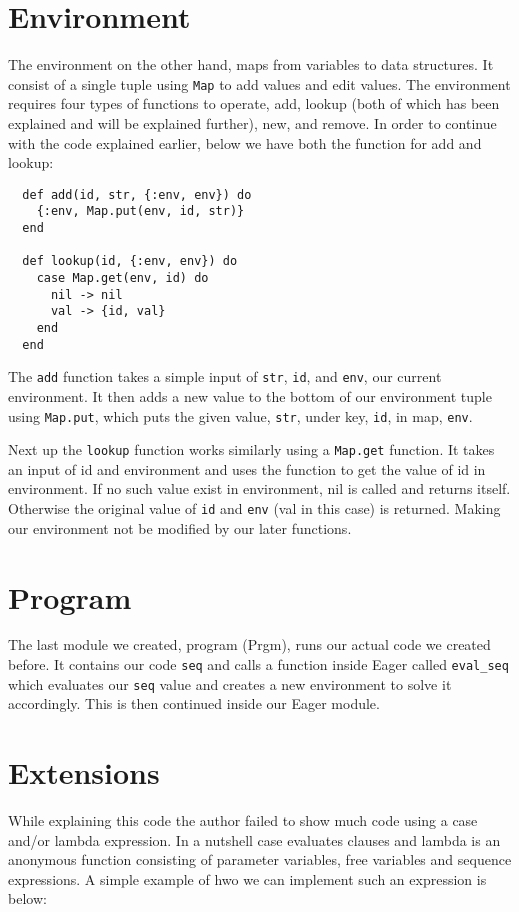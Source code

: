 \documentclass[a4paper,11pt]{article}
\begin{document}
\section*{Environment}

The environment on the other hand, maps from variables to data structures. It consist of a single tuple using {\tt Map} to add values and edit values. The environment requires four types of functions to operate, add, lookup (both of which has been explained and will be explained further), new, and remove. In order to continue with the code explained earlier, below we have both the function for add and lookup:

\begin{verbatim}
  def add(id, str, {:env, env}) do
    {:env, Map.put(env, id, str)}
  end
  
  def lookup(id, {:env, env}) do
    case Map.get(env, id) do
      nil -> nil
      val -> {id, val}
    end
  end
\end{verbatim}

The {\tt add} function takes a simple input of {\tt str}, {\tt id}, and {\tt env}, our current environment. It then adds a new value to the bottom of our environment tuple using {\tt Map.put}, which puts the given value, {\tt str}, under key, {\tt id}, in map, {\tt env}. 

Next up the {\tt lookup} function works similarly using a {\tt Map.get} function. It takes an input of id and environment and uses the function to get the value of id in environment. If no such value exist in environment, nil is called and returns itself. Otherwise the original value of {\tt id} and {\tt env} (val in this case) is returned. Making our environment not be modified by our later functions.

\section*{Program}
The last module we created, program (Prgm), runs our actual code we created before. It contains our code {\tt seq} and calls a function inside Eager called {\tt eval\_seq} which evaluates our {\tt seq} value and creates a new environment to solve it accordingly. This is then continued inside our Eager module.

\section*{Extensions}
While explaining this code the author failed to show much code using a case and/or lambda expression. In a nutshell case evaluates clauses and lambda is an anonymous function consisting of parameter variables, free variables and sequence expressions. A simple example of hwo we can implement such an expression is below:
\end{document}
